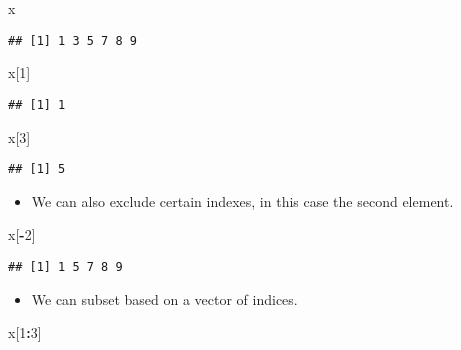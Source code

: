 \documentclass[]{book}
\newenvironment{Shaded}{\begin{snugshade}}{\end{snugshade}}
\newcommand{\DecValTok}[1]{\textcolor[rgb]{0.00,0.00,0.81}{#1}}
\newcommand{\OperatorTok}[1]{\textcolor[rgb]{0.81,0.36,0.00}{\textbf{#1}}}
\newcommand{\NormalTok}[1]{#1}
\providecommand{\tightlist}{%
  \setlength{\itemsep}{0pt}\setlength{\parskip}{0pt}}
\begin{document}
\begin{Shaded}
\begin{Highlighting}[]
\NormalTok{x}
\end{Highlighting}
\end{Shaded}

\begin{verbatim}
## [1] 1 3 5 7 8 9
\end{verbatim}

\begin{Shaded}
\begin{Highlighting}[]
\NormalTok{x[}\DecValTok{1}\NormalTok{]}
\end{Highlighting}
\end{Shaded}

\begin{verbatim}
## [1] 1
\end{verbatim}

\begin{Shaded}
\begin{Highlighting}[]
\NormalTok{x[}\DecValTok{3}\NormalTok{]}
\end{Highlighting}
\end{Shaded}

\begin{verbatim}
## [1] 5
\end{verbatim}

\begin{itemize}
\tightlist
\item
  We can also exclude certain indexes, in this case the second element.
\end{itemize}

\begin{Shaded}
\begin{Highlighting}[]
\NormalTok{x[}\OperatorTok{-}\DecValTok{2}\NormalTok{]}
\end{Highlighting}
\end{Shaded}

\begin{verbatim}
## [1] 1 5 7 8 9
\end{verbatim}

\begin{itemize}
\tightlist
\item
  We can subset based on a vector of indices.
\end{itemize}

\begin{Shaded}
\begin{Highlighting}[]
\NormalTok{x[}\DecValTok{1}\OperatorTok{:}\DecValTok{3}\NormalTok{]}
\end{Highlighting}
\end{Shaded}
\end{document}
